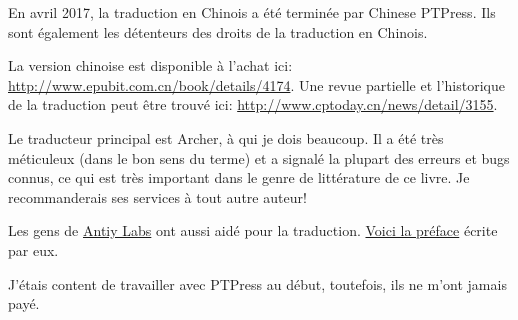 En avril 2017, la traduction en Chinois a été terminée par Chinese PTPress. Ils sont
également les détenteurs des droits de la traduction en Chinois.

La version chinoise est disponible à l'achat ici: \url{http://www.epubit.com.cn/book/details/4174}.
Une revue partielle et l'historique de la traduction peut être trouvé ici: \url{http://www.cptoday.cn/news/detail/3155}.


Le traducteur principal est Archer, à qui je dois beaucoup. Il a été très méticuleux
(dans le bon sens du terme) et a signalé la plupart des erreurs et bugs connus, ce
qui est très important dans le genre de littérature de ce livre.
Je recommanderais ses services à tout autre auteur!

Les gens de \href{http://www.antiy.net/}{Antiy Labs} ont aussi aidé pour la traduction.
\href{http://www.epubit.com.cn/book/onlinechapter/51413}{Voici la préface} écrite par eux.

J'étais content de travailler avec PTPress au début, toutefois, ils ne m'ont jamais payé.


